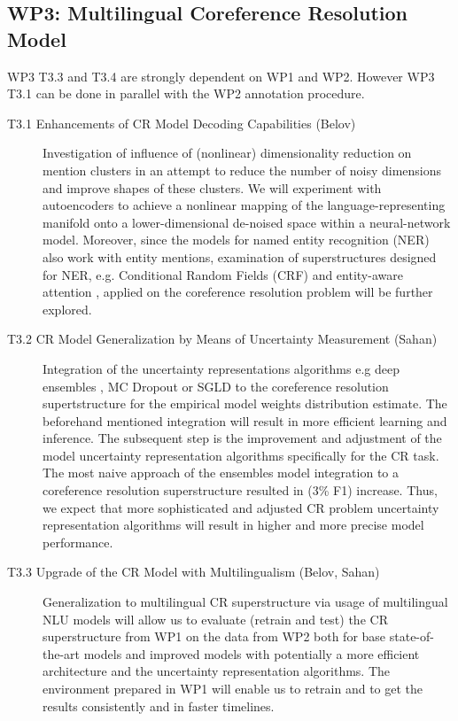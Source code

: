 \subsection*{WP3: Multilingual Coreference Resolution Model}

WP3 T3.3 and T3.4  are strongly dependent on WP1 and WP2. However WP3 T3.1 can be done in parallel with the WP2 annotation procedure.

\begin{description}
	\item [T3.1 Enhancements of CR Model Decoding Capabilities (Belov)] Investigation of influence of (nonlinear) dimensionality reduction on mention clusters in an attempt to reduce the number of noisy dimensions and improve shapes of these clusters. We will experiment with autoencoders \cite{autoencoders-Zabalza2016,autoencoders-Sahay2019} to achieve a nonlinear mapping of the language-representing manifold onto a lower-dimensional de-noised space within a neural-network model. Moreover, since the models for named entity recognition (NER) also work with entity mentions, examination of superstructures designed for NER, e.g. Conditional Random Fields (CRF) \cite{ner-Strakova2019,ner-Zhanming2019} and entity-aware attention \cite{ner-Yamada2020}, applied on the coreference resolution problem will be further explored.

	\item [T3.2 CR Model Generalization by Means of Uncertainty Measurement (Sahan)] Integration of the uncertainty representations algorithms e.g deep ensembles \cite{lakshminarayanan2016simple}, MC Dropout \cite{gal2017deep} or SGLD \cite{welling2011bayesian} to the coreference resolution supertstructure for the empirical model weights distribution estimate. The beforehand mentioned integration will result in more efficient learning and inference. The subsequent step is the improvement and adjustment of the model uncertainty representation algorithms specifically for the CR task. The most naive approach of the ensembles model integration to a coreference resolution superstructure \cite{cr-Lee17} resulted in (3\% F1) increase. Thus, we expect that more sophisticated and adjusted CR problem uncertainty representation algorithms will result in higher and more precise model performance.

	\item [T3.3 Upgrade of the CR Model with Multilingualism (Belov, Sahan)] Generalization to multilingual CR superstructure via usage of multilingual NLU models will allow us to evaluate (retrain and test) the CR superstructure from WP1 on the data from WP2 both for base state-of-the-art models and improved models with potentially a more efficient architecture and the uncertainty representation algorithms. The environment prepared in WP1 will enable us to retrain and to get the results consistently and in faster timelines. 



\end{description}
